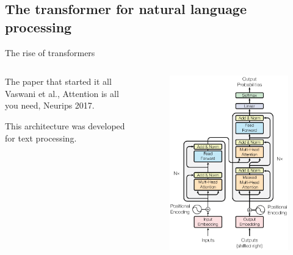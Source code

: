 \documentclass[xcolor=pdftex,dvipsnames,table,mathserif]{beamer}
\begin{document}
\subsection{The transformer for natural language processing}




\begin{frame}{The rise of transformers}

  \begin{columns}

    \begin{column}{.5\textwidth}
      \begin{block}{The paper that started it all}
        Vaswani et al., Attention is all you need, Neurips 2017.
      \end{block}
        This architecture was developed for text processing.
    \end{column}

    \begin{column}{.5\textwidth}
      \begin{figure}[ht]
        \centering
        \includegraphics[width=\textwidth]{transformer}
      \end{figure}
    \end{column}

  \end{columns}

\end{frame}
\end{document}
